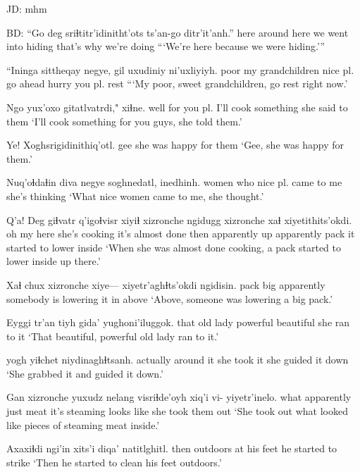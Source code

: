 \documentclass[12pt]{article}
\begin{document}
JD:  mhm

BD:  
\gll ``Go   deg   sriɬtitr'idinitht'ots ts'an-go ditr'it'anh.''
here {around here} {we went into hiding}  {that's why} {we're doing}
\glt ```We're here because we were hiding.'''
\glend

\gll ``Ininga  sittheqay        negye, gil      uxudiniy ni'uxliyiyh.
poor     {my grandchildren} {nice pl.} {go ahead} hurry    {you pl. rest}
\glt ```My poor, sweet grandchildren, go rest right now.'
\glend

\gll Ngo  yux'oxo     gitatlvatrdi,"      xiɬne.
well {for you pl.} {I'll cook something} {she said to them}
\glt `I'll cook something for you guys, she told them.'
\glend

\gll Ye! Xoghsrigidinithiq'otl.
gee {{she was happy for them}}
\glt `Gee, she was happy for them.'
\glend

\gll Nuq'oɬdaɬin diva negye   soghnedatl, inedhinh.
women       who  {nice pl.} {came to me} {she's thinking}
\glt `What nice women came to me, she thought.'
\glend

\gll  Q'a!  Deg  giɬvatr       q'igoɬvisr       xiyiɬ xizronche ngidugg xizronche xaɬ  xiyetithits'okdi.
{oh my} here {she's cooking} {it's almost done} then    apparently   up apparently  pack {it started to lower inside}
\glt `When she was almost done cooking, a pack started to lower inside up there.'
\glend

\gll Xaɬ  chux xizronche xiye--- xiyetr'aghɬts'okdi         ngidisin.
pack big         apparently {}  {somebody is lowering it in} above
\glt `Above, someone was lowering a big pack.'
\glend

\gll Eyggi tr'an    tiyh     gida'     yughoni'iluggok.
that  {old lady} powerful beautiful {she ran to it}
\glt `That beautiful, powerful old lady ran to it.'
\glend

 yogh      yiɬchet     niydinaghɬtsanh.
actually           {around it} {she took it} {she guided it down}
\glt `She grabbed it and guided it down.'
\glend

\gll Gan  xizronche yuxudz nelang visriɬde'oyh  xiq'i   vi-   yiyetr'inelo.
what    apparently       just   meat   {it's steaming} {looks like} {} {she took them out}
\glt `She took out what looked like pieces of steaming meat inside.'
\glend

\gll Axaxiɬdi ngi'in   xits'i diqa'    natitlghitl.
then         outdoors at     {his feet} {he started to strike}
\glt `Then he started to clean his feet outdoors.'
\glend
\end{document}
